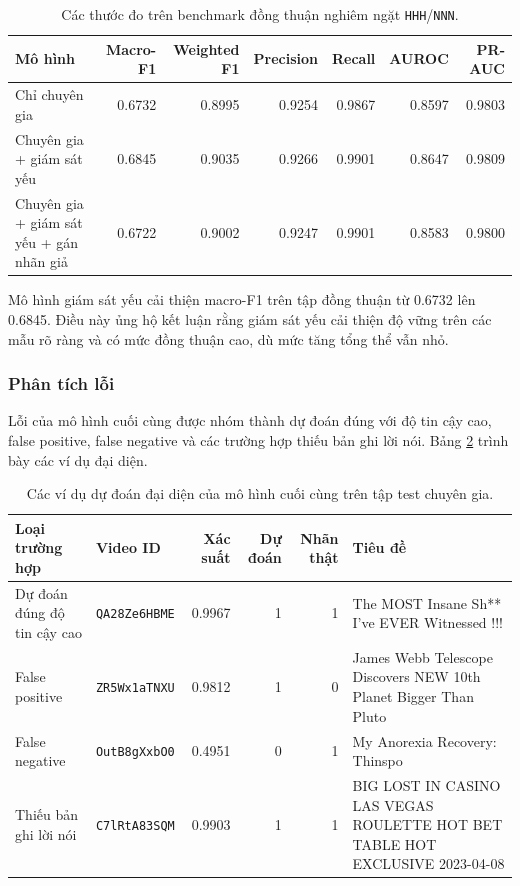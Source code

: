 \begin{table}[H]
\centering
\scriptsize
\renewcommand{\arraystretch}{1.25}
\begin{tabularx}{\textwidth}{|>{\raggedright\arraybackslash}X|r|r|r|r|r|r|}
\hline
\textbf{Mô hình} & \textbf{Macro-F1} & \textbf{Weighted F1} & \textbf{Precision} & \textbf{Recall} & \textbf{AUROC} & \textbf{PR-AUC} \\
\hline
Chỉ chuyên gia & 0.6732 & 0.8995 & 0.9254 & 0.9867 & 0.8597 & 0.9803 \\
\hline
Chuyên gia + giám sát yếu & 0.6845 & 0.9035 & 0.9266 & 0.9901 & 0.8647 & 0.9809 \\
\hline
Chuyên gia + giám sát yếu + gán nhãn giả & 0.6722 & 0.9002 & 0.9247 & 0.9901 & 0.8583 & 0.9800 \\
\hline
\end{tabularx}
\caption{Các thước đo trên benchmark đồng thuận nghiêm ngặt \texttt{HHH}/\texttt{NNN}.}
\label{tab:implementation-consensus-benchmark}
\end{table}

Mô hình giám sát yếu cải thiện macro-F1 trên tập đồng thuận từ 0.6732 lên 0.6845. Điều này ủng hộ kết luận rằng giám sát yếu cải thiện độ vững trên các mẫu rõ ràng và có mức đồng thuận cao, dù mức tăng tổng thể vẫn nhỏ.

\subsubsection{Phân tích lỗi}

Lỗi của mô hình cuối cùng được nhóm thành dự đoán đúng với độ tin cậy cao, false positive, false negative và các trường hợp thiếu bản ghi lời nói. Bảng \ref{tab:implementation-error-examples} trình bày các ví dụ đại diện.

\begin{table}[H]
\centering
\scriptsize
\renewcommand{\arraystretch}{1.25}
\begin{tabularx}{\textwidth}{|p{2.8cm}|p{2.4cm}|r|r|r|X|}
\hline
\textbf{Loại trường hợp} & \textbf{Video ID} & \textbf{Xác suất} & \textbf{Dự đoán} & \textbf{Nhãn thật} & \textbf{Tiêu đề} \\
\hline
Dự đoán đúng độ tin cậy cao & \texttt{QA28Ze6HBME} & 0.9967 & 1 & 1 & The MOST Insane Sh** I've EVER Witnessed !!! \\
\hline
False positive & \texttt{ZR5Wx1aTNXU} & 0.9812 & 1 & 0 & James Webb Telescope Discovers NEW 10th Planet Bigger Than Pluto \\
\hline
False negative & \texttt{OutB8gXxbO0} & 0.4951 & 0 & 1 & My Anorexia Recovery: Thinspo \\
\hline
Thiếu bản ghi lời nói & \texttt{C7lRtA83SQM} & 0.9903 & 1 & 1 & BIG LOST IN CASINO LAS VEGAS ROULETTE HOT BET TABLE HOT EXCLUSIVE 2023-04-08 \\
\hline
\end{tabularx}
\caption{Các ví dụ dự đoán đại diện của mô hình cuối cùng trên tập test chuyên gia.}
\label{tab:implementation-error-examples}
\end{table}

